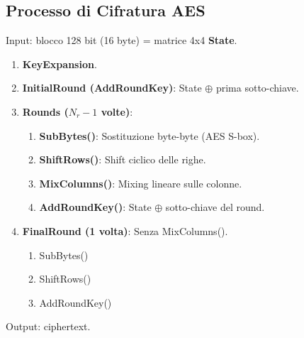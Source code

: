 \documentclass{article}
\begin{document}
\subsection{Processo di Cifratura AES}
Input: blocco 128 bit (16 byte) = matrice 4x4 \textbf{State}.
\begin{enumerate}
    \item \textbf{KeyExpansion}.
    \item \textbf{InitialRound (AddRoundKey)}: State $\oplus$ prima sotto-chiave.
    \item \textbf{Rounds ($N_r-1$ volte)}:
    \begin{enumerate}
        \item \textbf{SubBytes()}: Sostituzione byte-byte (AES S-box).
        \item \textbf{ShiftRows()}: Shift ciclico delle righe.
        \item \textbf{MixColumns()}: Mixing lineare sulle colonne.
        \item \textbf{AddRoundKey()}: State $\oplus$ sotto-chiave del round.
    \end{enumerate}
    \item \textbf{FinalRound (1 volta)}: Senza MixColumns().
    \begin{enumerate}
        \item SubBytes()
        \item ShiftRows()
        \item AddRoundKey()
    \end{enumerate}
\end{enumerate}
Output: ciphertext.
\end{document}
